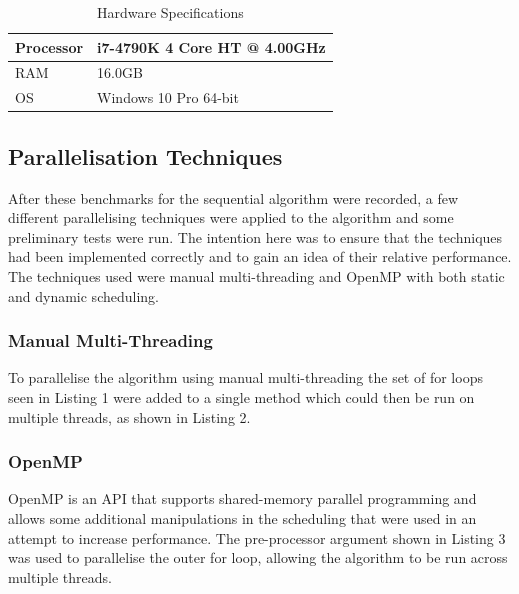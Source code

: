 \documentclass[journal,transmag]{IEEEtran}
\begin{document}
	\begin{table}[!h]
		\renewcommand{\arraystretch}{1.3}
		\caption{Hardware Specifications}
		\label{hardware}
		\centering
		\begin{tabular}{|l|l|}
			\hline
			Processor & i7-4790K 4 Core HT @ 4.00GHz\\ \hline
			RAM & 16.0GB\\ \hline
			OS & Windows 10 Pro 64-bit\\ \hline
		\end{tabular}
	\end{table}
	
	\subsection{Parallelisation Techniques}
	After these benchmarks for the sequential algorithm were recorded, a few different parallelising techniques were applied to the algorithm and some preliminary tests were run. The intention here was to ensure that the techniques had been implemented correctly and to gain an idea of their relative performance. The techniques used were manual multi-threading and OpenMP with both static and dynamic scheduling.\\
	
	\subsubsection{Manual Multi-Threading}
	To parallelise the algorithm using manual multi-threading the set of for loops seen in Listing 1 were added to a single method which could then be run on multiple threads, as shown in Listing 2.
	
	
	
	\subsubsection{OpenMP}
	OpenMP is an API that supports shared-memory parallel programming and allows some additional manipulations in the scheduling that were used in an attempt to increase performance. The pre-processor argument shown in Listing 3 was used to parallelise the outer for loop, allowing the algorithm to be run across multiple threads.
	
	
	
\end{document}

